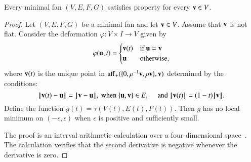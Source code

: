 








\begin{lemma}
Every minimal fan $(V,E,F,G)$ satisfies property  for every ${\mathbf v}\in V$.
\end{lemma}

\begin{proof} %
Let $(V,E,F,G)$ be a minimal fan and let ${\mathbf v}\in V$.  Assume that ${\mathbf v}$ is not flat.
Consider the deformation $\varphi:V\times I\to V$ given by
$$
\varphi({\mathbf u},t) =
\begin{cases}
{\mathbf v}(t) & \text{if } {\mathbf u}={\mathbf v}\\
{\mathbf u} & \text{otherwise},\\
\end{cases}
$$
where ${\mathbf v}(t)$ is the unique point in ${\operatorname{aff}}_+(\{0,\rho^{-1}{\mathbf v},\rho {\mathbf v}\},{\mathbf v})$ determined by the conditions:
$$
{\hskip0.1em|\hskip-0.15em|\hskip0.1em}{\mathbf v}(t) - {\mathbf u}{\hskip0.1em|\hskip-0.15em|\hskip0.1em} = {\hskip0.1em|\hskip-0.15em|\hskip0.1em}{\mathbf v} - {\mathbf u}{\hskip0.1em|\hskip-0.15em|\hskip0.1em}, \text{~when~} \{{\mathbf u},{\mathbf v}\}\in E,\quad
\text{~and~}
{{\hskip0.1em|\hskip-0.15em|\hskip0.1em}{\mathbf v}(t){\hskip0.1em|\hskip-0.15em|\hskip0.1em}} = (1-t){{\hskip0.1em|\hskip-0.15em|\hskip0.1em}{\mathbf v}{\hskip0.1em|\hskip-0.15em|\hskip0.1em}}.
$$
Define the function
$g(t)=\tau(V(t),E(t),F(t))$.
Then 
 $g$ has no local minimum on $(-\epsilon,\epsilon)$ when $\epsilon$ is positive and sufficiently small.

The proof is an interval arithmetic calculation over a four-dimensional space~\cite[cc:d2a]{hales:2009:nonlinear}.  %
The calculation verifies  that the second derivative is negative whenever the derivative is zero.
\end{proof}




